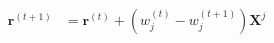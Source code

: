 \newcommand{\matrix}[1]{\mathbf{#1}}
\newcommand{\vector}[1]{\mathbf{#1}}
\newcommand{\X}{\matrix{X}}
\newcommand{\y}{\vector{y}}
\newcommand{\w}{\vector{w}}
\newcommand{\r}{\vector{r}}
\begin{align*}
\r^{(t+1)} &= \r^{(t)} + (w_j^{(t)} - w_j^{(t+1)}) \X^j \\
\end{align*}
